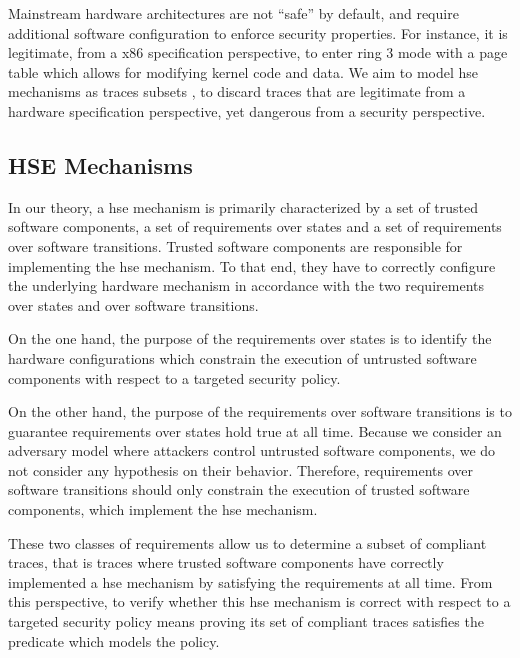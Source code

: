 Mainstream hardware architectures are not ``safe'' by default, and require
additional software configuration to enforce security properties.
%
For instance, it is legitimate, from a x86 specification perspective, to enter
ring 3 mode with a page table which allows for modifying kernel code and data.
%
We aim to model \ac{hse} mechanisms as traces subsets 	, to discard traces that are
legitimate from a hardware specification perspective, yet dangerous from a
security perspective.

\subsection{HSE Mechanisms}
\label{subsec:speccert:hse}

In our theory, a \ac{hse} mechanism is primarily
characterized by a set of trusted software components, a set of requirements
over states and a set of requirements over software transitions.
%
Trusted software components are responsible for implementing the \ac{hse}
mechanism.
%
To that end, they have to correctly configure the underlying hardware mechanism in
accordance with the two requirements over states and over software transitions.

On the one hand, the purpose of the requirements over states is to identify the
hardware configurations which constrain the execution of untrusted software
components with respect to a targeted security policy.

On the other hand, the purpose of the requirements over software transitions is
to guarantee requirements over states hold true at all time.
%
Because we consider an adversary model where attackers control untrusted
software components, we do not consider any hypothesis on their behavior.
%
Therefore, requirements over software transitions should only constrain the
execution of trusted software components, which implement the \ac{hse}
mechanism.

These two classes of requirements allow us to determine a subset of compliant
traces, that is traces where trusted software components have correctly
implemented a \ac{hse} mechanism by satisfying the requirements at all time.
%
%
From this perspective, to verify whether this \ac{hse} mechanism is correct with
respect to a targeted security policy means proving its set of compliant traces
satisfies the predicate which models the policy.

